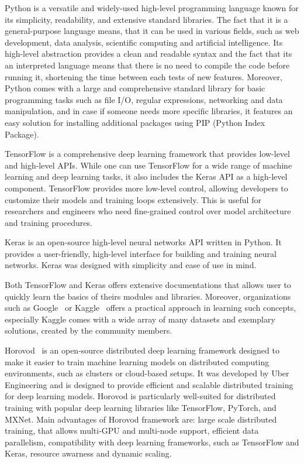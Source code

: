 Python is a versatile and widely-used high-level programming language known
for its simplicity, readability, and extensive standard libraries. The fact
that it is a general-purpose language means, that it can be used in various
fields, such as web development, data analysis, scientific computing and
artificial intelligence. Its high-level abstraction provides a clean and
readable syntax and the fact that its an interpreted language means that
there is no need to compile the code before running it, shortening the
time between each tests of new features. Moreover, Python comes with a large
and comprehensive standard library for basic programming tasks such as file I/O,
regular expressions, networking and data manipulation, and in case if someone
needs more specific libraries, it features an easy solution for installing
additional packages using PIP (Python Index Package).

TensorFlow is a comprehensive deep learning framework that provides low-level
and high-level APIs. While one can use TensorFlow for a wide range of machine
learning and deep learning tasks, it also includes the Keras API as a high-level
component. TensorFlow provides more low-level control, allowing developers to
customize their models and training loops extensively. This is useful for
researchers and engineers who need fine-grained control over model architecture
and training procedures.

Keras is an open-source high-level neural networks API written in Python.
It provides a user-friendly, high-level interface for building and training
neural networks. Keras was designed with simplicity and ease of use in mind.

Both TensorFlow and Keras offers extensive documentations that allows user
to quickly learn the basics of theirs modules and libraries. Moreover,
organizations such as Google~\cite{Google_Machine_Learning_Crash_Course}
or Kaggle~\cite{Kaggle} offers a practical approach in learning such concepts,
especially Kaggle comes with a wide array of many datasets and exemplary
solutions, created by the community members.

Horovod~\cite{Horovod} is an open-source distributed deep learning framework
designed to make it easier to train machine learning models on distributed
computing environments, such as clusters or cloud-based setups. It was
developed by Uber Engineering and is designed to provide efficient and
scalable distributed training for deep learning models. Horovod is
particularly well-suited for distributed training with popular deep learning
libraries like TensorFlow, PyTorch, and MXNet. Main advantages of Horovod
framework are: large scale distributed training, that allows multi-GPU and
multi-node support, efficient data parallelism, compatibility with deep
learning frameworks, such as TensorFlow and Keras, resource awarness and
dynamic scaling.

